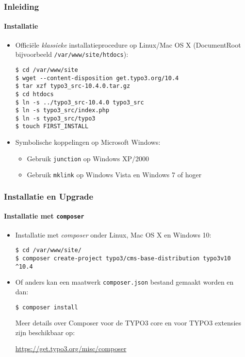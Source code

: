 
\begin{frame}[fragile]
	\frametitle{Inleiding}
	\framesubtitle{Installatie}

	\begin{itemize}
		\item Offici\"ele \textit{klassieke} installatieprocedure op Linux/Mac OS X\newline
		(DocumentRoot bijvoorbeeld \texttt{/var/www/site/htdocs}):
\begin{lstlisting}
$ cd /var/www/site
$ wget --content-disposition get.typo3.org/10.4
$ tar xzf typo3_src-10.4.0.tar.gz
$ cd htdocs
$ ln -s ../typo3_src-10.4.0 typo3_src
$ ln -s typo3_src/index.php
$ ln -s typo3_src/typo3
$ touch FIRST_INSTALL
\end{lstlisting}

		\item Symbolische koppelingen op Microsoft Windows:

			\begin{itemize}
				\item Gebruik \texttt{junction} op Windows XP/2000
				\item Gebruik \texttt{mklink} op Windows Vista en Windows 7 of hoger
			\end{itemize}

	\end{itemize}
\end{frame}


\begin{frame}[fragile]
	\frametitle{Installatie en Upgrade}
	\framesubtitle{Installatie met \texttt{composer}}

	\begin{itemize}
		\item Installatie met \textit{composer} onder Linux, Mac OS X en Windows 10:
\begin{lstlisting}
$ cd /var/www/site/
$ composer create-project typo3/cms-base-distribution typo3v10 ^10.4
\end{lstlisting}

		\item Of anders kan een maatwerk \texttt{composer.json} bestand gemaakt worden en dan:
\begin{lstlisting}
$ composer install
\end{lstlisting}

			Meer details over Composer voor de TYPO3 core en voor TYPO3 extensies
			zijn beschikbaar op:

			\small
				\href{https://get.typo3.org/misc/composer}{https://get.typo3.org/misc/composer}
			\normalsize

	\end{itemize}
\end{frame}

